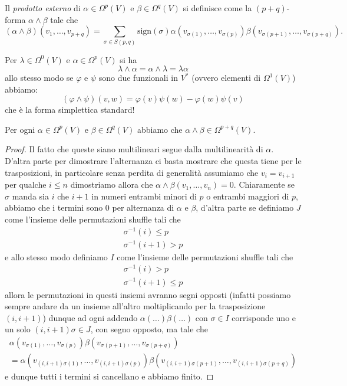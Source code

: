 \documentclass[11pt]{scrartcl}
\begin{document}
	\begin{definition}
		Il \textit{prodotto esterno} di $\alpha\in \Omega^p(V)$ e $\beta\in \Omega^q(V)$ si definisce come la $(p+q)$-forma $\alpha\land \beta$ tale che 
		$$\left(\alpha\land \beta\right)(v_1,\dots,v_{p+q})=\sum_{\sigma\in S(p,q)}\text{sign}(\sigma)\alpha\left(v_{\sigma(1)},\dots,v_{\sigma(p)}\right)\beta\left(v_{\sigma(p+1)},\dots,v_{\sigma(p+q)}\right).$$ 
	\end{definition}
	\begin{remark}
		Per $\lambda\in \Omega^0(V)$ e $\alpha\in \Omega^p(V)$ si ha 
		$$\lambda\land \alpha=\alpha\land \lambda=\lambda\alpha$$
		allo stesso modo se $\varphi$ e $\psi$ sono due funzionali in $V^*$ (ovvero elementi di $\Omega^1(V)$) abbiamo:
		$$\left(\varphi\land \psi\right)(v,w)=\varphi(v)\psi(w)-\varphi(w)\psi(v)$$
		che è la forma simplettica standard!
	\end{remark}
	\begin{lemma}
		Per ogni $\alpha\in \Omega^p(V)$ e $\beta\in \Omega^q(V)$ abbiamo che $\alpha\land \beta\in \Omega^{p+q}(V)$.
	\end{lemma}
	\begin{proof}
		Il fatto che queste siano multilineari segue dalla multilinearità di $\alpha$. D'altra parte per dimostrare l'alternanza ci basta mostrare che questa tiene per le trasposizioni, in particolare senza perdita di generalità assumiamo che $v_i=v_{i+1}$ per qualche $i\le n$ dimostriamo allora che $\alpha\land \beta(v_1,\dots,v_n)=0$. Chiaramente se $\sigma$ manda sia $i$ che $i+1$ in numeri entrambi minori di $p$ o entrambi maggiori di $p$, abbiamo che i termini sono $0$ per alternanza di $\alpha$ e $\beta$, d'altra parte se definiamo $J$ come l'insieme delle permutazioni shuffle tali che
		\begin{gather*}
			\sigma^{-1}(i)\le p \\
			\sigma^{-1}(i+1)>p
		\end{gather*}
		e allo stesso modo definiamo $I$ come l'insieme delle permutazioni shuffle tali che
		\begin{gather*}
			\sigma^{-1}(i)> p \\
			\sigma^{-1}(i+1)\le p
		\end{gather*}
		allora le permutazioni in questi insiemi avranno segni opposti (infatti possiamo sempre andare da un insieme all'altro moltiplicando per la trasposizione $(i,i+1)$) dunque ad ogni addendo $\alpha(\dots)\beta(\dots)$ con $\sigma\in I$ corrisponde uno e un solo $(i,i+1)\sigma\in J$, con segno opposto, ma tale che 
		\begin{gather*}
			\alpha\left(v_{\sigma(1)},\dots,v_{\sigma(p)}\right)\beta\left(v_{\sigma(p+1)},\dots,v_{\sigma(p+q)}\right) \\
			=\alpha\left(v_{(i,i+1)\sigma(1)},\dots,v_{(i,i+1)\sigma(p)}\right)\beta\left(v_{(i,i+1)\sigma(p+1)},\dots,v_{(i,i+1)\sigma(p+q)}\right)
		\end{gather*}
		e dunque tutti i termini si cancellano e abbiamo finito.
	\end{proof}
\end{document}
